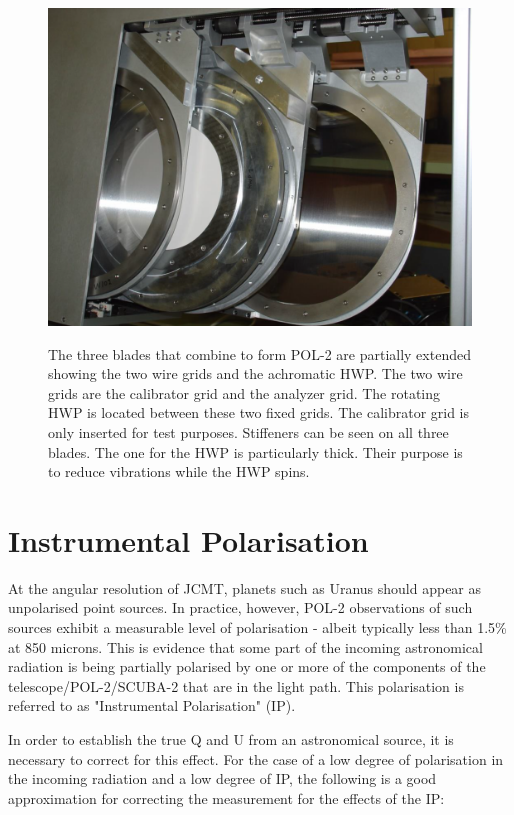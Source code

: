 \begin{figure}[t!]
\begin{center}
\includegraphics[width=0.7\linewidth]{pol2-three-components.png}
\label{fig:pol2components}
\caption [POL-2 components]{
  The three blades that combine to form POL-2 are partially
  extended showing the two wire grids and the achromatic HWP.
  The two wire grids are the calibrator grid and the analyzer grid.
  The rotating HWP is located between these two fixed grids.
  The calibrator grid is only inserted for test purposes.
  Stiffeners can be seen on all three blades. The one for the HWP
  is particularly thick. Their purpose is to reduce vibrations while
  the HWP spins.
}
\end{center}
\end{figure}




\section{Instrumental Polarisation}
\label{sec:ip}

At the angular resolution of JCMT, planets such as Uranus should
appear as unpolarised point sources.  In practice, however, POL-2
observations of such sources exhibit a measurable level of
polarisation - albeit typically less than 1.5\% at 850 microns. This
is evidence that some part of the incoming astronomical radiation is
being partially polarised by one or more of the components of the
telescope/POL-2/SCUBA-2 that are in the light path. This polarisation
is referred to as "Instrumental Polarisation" (IP).

In order to establish the true Q and U from an astronomical source, it
is necessary to correct for this effect. For the case of a low degree
of polarisation in the incoming radiation and a low degree of IP, the
following is a good approximation for correcting the measurement for
the effects of the IP:

